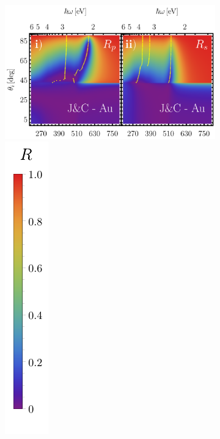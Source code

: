 \documentclass[letterpaper,11pt] {article}
\begin{document}
	\begin{figure}[h!]\centering
	\begin{subfigure}{.01\linewidth}\caption{}\label{sfig:JCAu}\vspace{4.5cm}\end{subfigure}\hspace*{-1em}
	\begin{subfigure}{.45\linewidth}\includegraphics[width = .95\linewidth,]{5-JCAu/0-2D_Grid.png}\includegraphics[scale=.6, trim={00 00 00 00}, clip]{0-RBar_v}
	\end{subfigure}
	\begin{subfigure}{.01\linewidth}\caption{}\label{sfig:JCAg}\vspace{2.5cm}\end{subfigure}\hspace*{-1.em}

\end{figure}
\end{document}
